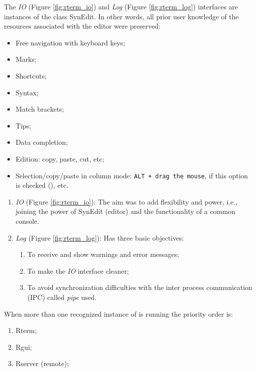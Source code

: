 The \textit{IO}
(Figure \ref{fig:rterm_io})
and \textit{Log}
(Figure \ref{fig:rterm_log})
interfaces are instances of the class
SynEdit. In other words, all prior user knowledge of the resources associated with the editor were preserved:

\begin{itemize}
  \item Free navigation with keyboard keys;
  \item Marks;
  \item Shortcuts;
  \item Syntax;
  \item Match brackets;
  \item Tips;
  \item Data completion;
  \item Edition: copy, paste, cut, etc;
  \item Selection/copy/paste in column mode:
    \texttt{ALT + drag the mouse}, if this option is checked
    (), etc.
\end{itemize}

\begin{enumerate}
  \item \textit{IO} (Figure \ref{fig:rterm_io}): The aim was to add flexibility and power, i.e.,
    joining the power of SynEdit (editor) and the functionality of
    a common console.
  \item \textit{Log} (Figure \ref{fig:rterm_log}): Has three basic objectives:
    \begin{enumerate}
      \item To receive and show warnings and error messages;
      \item To make the \textit{IO} interface cleaner;
      \item To avoid synchronization difficulties with the inter
        process communication (IPC) called \textit{pipe} used.
    \end{enumerate}
\end{enumerate}

When more than one recognized instance of \RR{} is running the priority
order is:

\begin{enumerate}
  \item Rterm;
  \item Rgui;
  \item Rserver (remote);
\end{enumerate}


